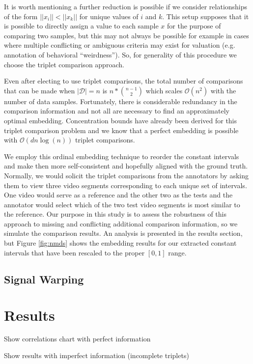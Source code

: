 \documentclass[]{article}
\begin{document}
It is worth mentioning a further reduction is possible if we consider relationships of the form $||x_i|| < ||x_k||$ for unique values of $i$ and $k$.  This setup supposes that it is possible to directly assign a value to each sample $x$ for the purpose of comparing two samples, but this may not always be possible for example in cases where multiple conflicting or ambiguous criteria may exist for valuation (e.g. annotation of behavioral ``weirdness'').  So, for generality of this procedure we choose the triplet comparison approach.

Even after electing to use triplet comparisons, the total number of comparisons that can be made when $|\mathcal{D}|=n$ is $n*{n-1 \choose 2}$ which scales $\mathcal{O}(n^2)$ with the number of data samples.  Fortunately, there is considerable redundancy in the comparison information and not all are necessary to find an approximately optimal embedding.  Concentration bounds have already been derived for this triplet comparison problem and we know that a perfect embedding is possible with $\mathcal{O}(dn\log(n))$ triplet comparisons.

We employ this ordinal embedding technique to reorder the constant intervals and make then more self-consistent and hopefully aligned with the ground truth.  Normally, we would solicit the triplet comparisons from the annotators by asking them to view three video segments corresponding to each unique set of intervals.  One video would serve as a reference and the other two as the tests and the annotator would select which of the two test video segments is most similar to the reference.  Our purpose in this study is to assess the robustness of this approach to missing and conflicting additional comparison information, so we simulate the comparison results.  An analysis is presented in the results section, but Figure \ref{fig:nmds} shows the embedding results for our extracted constant intervals that have been rescaled to the proper $[0,1]$ range.

\subsection{Signal Warping}
\section{Results}
Show correlations chart with perfect information

Show results with imperfect information (incomplete triplets)
\end{document}
